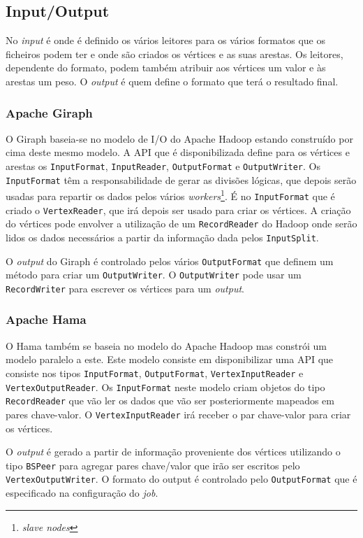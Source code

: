 \newpage
\subsection{Input/Output}
No \textit{input} é onde é definido os vários leitores para os vários formatos que os ficheiros podem ter e onde são criados os vértices e as suas arestas. Os leitores, dependente do formato, podem também atribuir aos vértices um valor e às arestas um peso.
O \textit{output} é quem define	 o formato que terá o resultado final.
\subsubsection*{Apache Giraph}
O Giraph baseia-se no modelo de I/O do Apache Hadoop estando construído por cima deste mesmo modelo.
A API que é disponibilizada define para os vértices e arestas os \texttt{InputFormat}, \texttt{InputReader}, \texttt{OutputFormat} e \texttt{OutputWriter}.
Os \texttt{InputFormat} têm a responsabilidade de gerar as divisões lógicas, que depois serão usadas para repartir os dados pelos vários
\textit{workers}\footnote{\textit{slave nodes}}. É no \texttt{InputFormat} que é criado o \texttt{VertexReader}, que irá depois ser usado para criar os vértices.
A criação do vértices pode envolver a utilização de um \texttt{RecordReader} do Hadoop onde serão lidos os dados necessários a partir da informação dada pelos \texttt{InputSplit}.

O \textit{output} do Giraph é controlado pelos vários \texttt{OutputFormat} que definem um método para criar um \texttt{OutputWriter}. O \texttt{OutputWriter} pode usar um \texttt{RecordWriter}
para escrever os vértices para um \textit{output}.

\subsubsection*{Apache Hama}

O Hama também se baseia no modelo do Apache Hadoop mas constrói um modelo paralelo a este.
Este modelo consiste em disponibilizar uma API que consiste nos tipos \texttt{InputFormat}, \texttt{OutputFormat}, \texttt{VertexInputReader} e \texttt{VertexOutputReader}. Os \texttt{InputFormat} neste modelo criam objetos do tipo \texttt{RecordReader} 
que vão ler os dados que vão ser posteriormente mapeados em pares chave-valor. O \texttt{VertexInputReader} irá receber o par chave-valor para criar os
vértices.

O \textit{output} é gerado a partir de informação proveniente dos vértices utilizando o tipo \texttt{BSPeer} para agregar pares chave/valor que irão
ser escritos pelo \texttt{VertexOutputWriter}. O formato do output é controlado pelo \texttt{OutputFormat} que é especificado na
configuração do \textit{job}.

